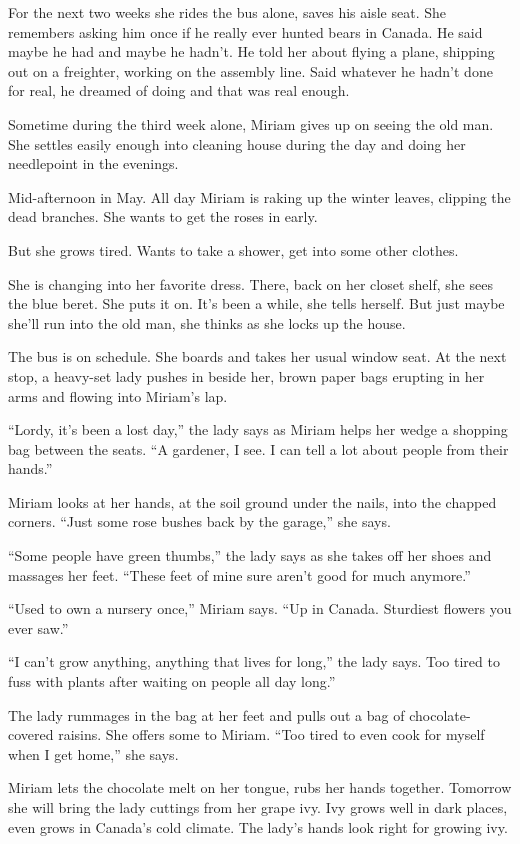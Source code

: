 \documentclass[twoside,10pt]{book}
\begin{document}
For the next two weeks she rides the bus alone, saves his aisle seat.
She remembers asking him once if he really ever hunted bears in Canada.
He said maybe he had and maybe he hadn't. He told her about flying a
plane, shipping out on a freighter, working on the assembly line. Said
whatever he hadn't done for real, he dreamed of doing and that was real
enough.

Sometime during the third week alone, Miriam gives up on seeing the old
man. She settles easily enough into cleaning house during the day and
doing her needlepoint in the evenings.

Mid-afternoon in May. All day Miriam is raking up the winter leaves,
clipping the dead branches. She wants to get the roses in early.

But she grows tired. Wants to take a shower, get into some other
clothes.

She is changing into her favorite dress. There, back on her closet
shelf, she sees the blue beret. She puts it on. It's been a while, she
tells herself. But just maybe she'll run into the old man, she thinks as
she locks up the house.

The bus is on schedule. She boards and takes her usual window seat. At
the next stop, a heavy-set lady pushes in beside her, brown paper bags
erupting in her arms and flowing into Miriam's lap.

``Lordy, it's been a lost day,'' the lady says as Miriam helps her wedge
a shopping bag between the seats. ``A gardener, I see. I can tell a lot
about people from their hands.''

Miriam looks at her hands, at the soil ground under the nails, into the
chapped corners. ``Just some rose bushes back by the garage,'' she says.

``Some people have green thumbs,'' the lady says as she takes off her
shoes and massages her feet. ``These feet of mine sure aren't good for
much anymore.''

``Used to own a nursery once,'' Miriam says. ``Up in Canada. Sturdiest
flowers you ever saw.''

``I can't grow anything, anything that lives for long,'' the lady says.
Too tired to fuss with plants after waiting on people all day long.''

The lady rummages in the bag at her feet and pulls out a bag of
chocolate-covered raisins. She offers some to Miriam. ``Too tired to
even cook for myself when I get home,'' she says.

Miriam lets the chocolate melt on her tongue, rubs her hands together.
Tomorrow she will bring the lady cuttings from her grape ivy. Ivy grows
well in dark places, even grows in Canada's cold climate. The lady's
hands look right for growing ivy.
\end{document}
